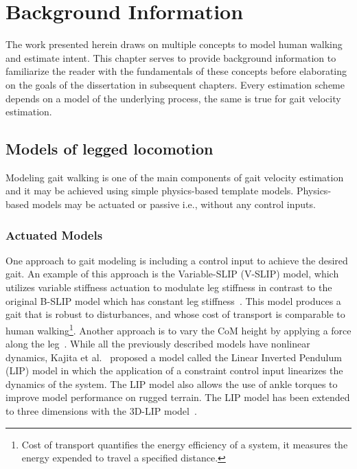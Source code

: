\chapter{Background Information}\label{chapter:bg_info}

The work presented herein draws on multiple concepts to model human walking and estimate intent. This chapter serves to provide background information to familiarize the reader with the fundamentals of these concepts before elaborating on the goals of the dissertation in subsequent chapters. Every estimation scheme depends on a model of the underlying process, the same is true for gait velocity estimation.

\section{Models of legged locomotion}

Modeling gait walking is one of the main components of gait velocity estimation and it may be achieved using simple physics-based template models. Physics-based models may be actuated or passive i.e., without any control inputs.  

\subsection{Actuated Models}

One approach to gait modeling is including a control input to achieve the desired gait. An example of this approach is the Variable-SLIP (V-SLIP) model, which utilizes variable stiffness actuation to modulate leg stiffness in contrast to the original B-SLIP model which has constant leg stiffness~\cite{visser2017bipedal}. This model produces a gait that is robust to disturbances, and whose cost of transport is comparable to human walking\footnote{Cost of transport quantifies the energy efficiency of a system, it measures the energy expended to travel a specified distance.}. Another approach is to vary the CoM height by applying a force along the leg~\cite{koolen2016balance}. While all the previously described models have nonlinear dynamics, Kajita et al.~\cite{kajita1991study} proposed a model called the Linear Inverted Pendulum (LIP) model in which the application of a constraint control input linearizes the dynamics of the system. The LIP model also allows the use of ankle torques to improve model performance on rugged terrain. The LIP model has been extended to three dimensions with the 3D-LIP model~\cite{kajita20013d}.

